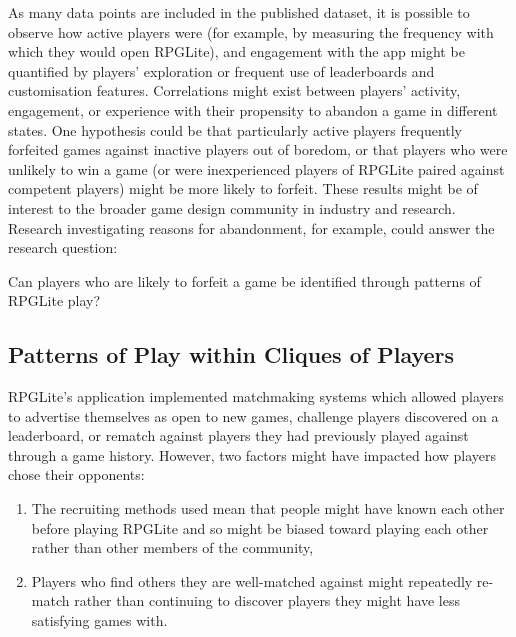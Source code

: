 As many data points are included in the published dataset, it is possible to
observe how active players were (for example, by measuring the frequency with
which they would open RPGLite), and engagement with the app might be quantified
by players' exploration or frequent use of leaderboards and customisation
features. Correlations might exist between players' activity, engagement, or
experience with their propensity to abandon a game in different states. One
hypothesis could be that particularly active players frequently forfeited games
against inactive players out of boredom, or that players who were unlikely to
win a game (or were inexperienced players of RPGLite paired against competent
players) might be more likely to forfeit. These results might be of interest to
the broader game design community in industry and research. Research
investigating reasons for abandonment, for example, could answer the research
question:

\begin{researchquestion}
    Can players who are likely to forfeit a game be identified through patterns
    of RPGLite play?
\end{researchquestion}





\subsection{Patterns of Play within Cliques of Players}
\label{future_work_rpglite_playerbase_clique_discovery}

RPGLite's application implemented matchmaking systems which allowed players to
advertise themselves as open to new games, challenge players discovered on a
leaderboard, or rematch against players they had previously played against
through a game history. However, two factors might have impacted how players
chose their opponents:

\begin{enumerate}
    \item The recruiting methods used mean that people might have known each
    other before playing RPGLite and so might be biased toward playing each
    other rather than other members of the community,
    \item Players who find others they are well-matched against might repeatedly
    re-match rather than continuing to discover players they might have less
    satisfying games with.
\end{enumerate}

